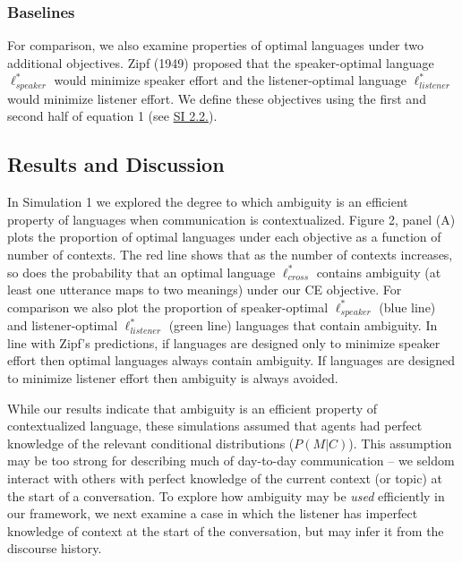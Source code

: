 \documentclass[10pt, letterpaper]{article}
\begin{document}
\subsubsection{Baselines}\label{baselines}

For comparison, we also examine properties of optimal languages under
two additional objectives. Zipf (1949) proposed that the speaker-optimal
language \(\ell_{speaker}^*\) would minimize speaker effort and the
listener-optimal language \(\ell_{listener}^*\) would minimize listener
effort. We define these objectives using the first and second half of
equation 1 (see
\href{https://github.com/benpeloquin7/zipf_principles/blob/master/paper/supplementary_materials.pdf}{SI 2.2.}).\par

\subsection{Results and Discussion}\label{results-and-discussion}

In Simulation 1 we explored the degree to which ambiguity is an
efficient property of languages when communication is contextualized.
Figure 2, panel (A) plots the proportion of optimal languages under each
objective as a function of number of contexts. The red line shows that
as the number of contexts increases, so does the probability that an
optimal language \(\ell^*_{cross}\) contains ambiguity (at least one
utterance maps to two meanings) under our CE objective. For comparison
we also plot the proportion of speaker-optimal \(\ell^*_{speaker}\)
(blue line) and listener-optimal \(\ell^*_{listener}\) (green line)
languages that contain ambiguity. In line with Zipf's predictions, if
languages are designed only to minimize speaker effort then optimal
languages always contain ambiguity. If languages are designed to
minimize listener effort then ambiguity is always avoided.\par

While our results indicate that ambiguity is an efficient property of
contextualized language, these simulations assumed that agents had
perfect knowledge of the relevant conditional distributions
(\(P(M|C)\)). This assumption may be too strong for describing much of
day-to-day communication -- we seldom interact with others with perfect
knowledge of the current context (or topic) at the start of a
conversation. To explore how ambiguity may be \textit{used} efficiently
in our framework, we next examine a case in which the listener has
imperfect knowledge of context at the start of the conversation, but may
infer it from the discourse history.\par
\end{document}
